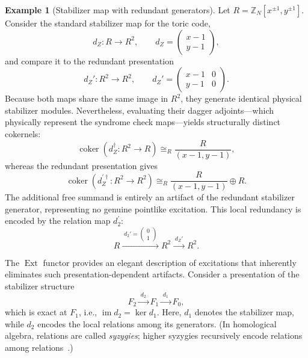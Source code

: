 \documentclass[aps,prx,english,superscriptaddress,twocolumn,tightenlines,showpacs,longbibliography,floatfix,amsfonts]{revtex4-2}
\theoremstyle{remark}
\theoremstyle{definition}
\newtheorem{example}{Example}
\begin{document}
\begin{example}[Stabilizer map with redundant generators] \label{eg:redundancy}
	Let $R=\mathbb Z_N[x^{\pm1},y^{\pm1}]$. Consider the standard stabilizer map for the toric code,
	\begin{equation}
		d_Z:R\to R^2, \qquad d_Z= \begin{pmatrix} x-1\\ y-1 \end{pmatrix},
	\end{equation}
	and compare it to the redundant presentation
	\begin{equation}
		d_Z':R^2\to R^2, \qquad d_Z'= \begin{pmatrix} x-1 & 0\\ y-1 & 0 \end{pmatrix}.
	\end{equation}
	Because both maps share the same image in $R^2$, they generate identical physical stabilizer modules. Nevertheless, evaluating their dagger adjoints—which physically represent the syndrome check maps—yields structurally distinct cokernels:
	\begin{equation}
		\operatorname{coker} (d_Z^\dagger: R^2 \to R) \cong_R \frac{R}{(x-1,y-1)},
	\end{equation}
	whereas the redundant presentation gives
	\begin{equation}
		\operatorname{coker} (d_Z^{\prime\dagger}: R^2 \to R^2) \cong_R \frac{R}{(x-1,y-1)}\oplus R.
	\end{equation}
	The additional free summand is entirely an artifact of the redundant
	stabilizer generator, representing no genuine pointlike excitation. This
	local redundancy is encoded by the relation map $d_2^\prime$:
	\begin{equation}
		R \xrightarrow{\;d_2'=\begin{pmatrix}0\\1\end{pmatrix}\;} R^2 \xrightarrow{\;d_Z'\;} R^2.
	\end{equation}
\end{example}

The $\operatorname{Ext}$ functor provides an elegant description of excitations that inherently eliminates such presentation-dependent artifacts. Consider a presentation of the stabilizer structure
\begin{equation}
	F_2 \xrightarrow{\;d_2\;} F_1 \xrightarrow{\;d_1\;} F_0,
	\label{eq:local-relation-sequence}
\end{equation}
which is exact at $F_1$, i.e., $\operatorname{im} d_2 = \ker d_1$. Here,
$d_1$ denotes the stabilizer map, while $d_2$ encodes the local relations
among its generators. (In homological algebra, relations are called
\emph{syzygies}; higher syzygies recursively encode relations among
relations~\cite[Sec.~1.10]{eisenbud1995commutative}.)
\end{document}
